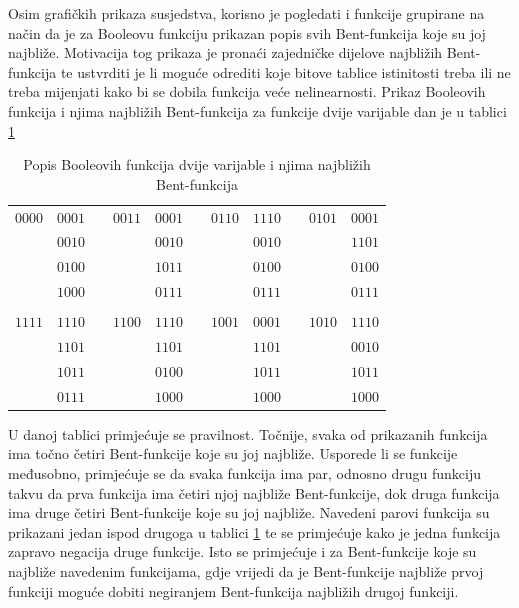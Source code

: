Osim grafičkih prikaza susjedstva, korisno je pogledati i funkcije grupirane na način da je za Booleovu funkciju prikazan popis svih Bent-funkcija koje su joj najbliže.
Motivacija tog prikaza je pronaći zajedničke dijelove najbližih Bent-funkcija te ustvrditi je li moguće odrediti koje bitove tablice istinitosti treba ili ne treba mijenjati kako bi se dobila funkcija veće nelinearnosti.
Prikaz Booleovih funkcija i njima najbližih Bent-funkcija za funkcije dvije varijable dan je u tablici \ref{tbl:neighbor}
\begin{table}[]
\centering
\begin{tabular}{ccccccccccc}
$0000$ & $0001$ &  & $0011$ & $0001$ &  & $0110$ & $1110$ &  & $0101$ & $0001$ \\
       & $0010$ &  &        & $0010$ &  &        & $0010$ &  &        & $1101$ \\
       & $0100$ &  &        & $1011$ &  &        & $0100$ &  &        & $0100$ \\
       & $1000$ &  &        & $0111$ &  &        & $0111$ &  &        & $0111$ \\
       &        &  &        &        &  &        &        &  &        &        \\
$1111$ & $1110$ &  & $1100$ & $1110$ &  & $1001$ & $0001$ &  & $1010$ & $1110$ \\
       & $1101$ &  &        & $1101$ &  &        & $1101$ &  &        & $0010$ \\
       & $1011$ &  &        & $0100$ &  &        & $1011$ &  &        & $1011$ \\
       & $0111$ &  &        & $1000$ &  &        & $1000$ &  &        & $1000$ \\
\end{tabular}
\caption{Popis Booleovih funkcija dvije varijable i njima najbližih Bent-funkcija}
\label{tbl:neighbor}
\end{table}
U danoj tablici primjećuje se pravilnost.
Točnije, svaka od prikazanih funkcija ima točno četiri Bent-funkcije koje su joj najbliže.
Usporede li se funkcije međusobno, primjećuje se da svaka funkcija ima par, odnosno drugu funkciju takvu da prva funkcija ima četiri njoj najbliže Bent-funkcije, dok druga funkcija ima druge četiri Bent-funkcije koje su joj najbliže.
Navedeni parovi funkcija su prikazani jedan ispod drugoga u tablici \ref{tbl:neighbor} te se primjećuje kako je jedna funkcija zapravo negacija druge funkcije.
Isto se primjećuje i za Bent-funkcije koje su najbliže navedenim funkcijama, gdje vrijedi da je Bent-funkcije najbliže prvoj funkciji moguće dobiti negiranjem Bent-funkcija najbližih drugoj funkciji.
